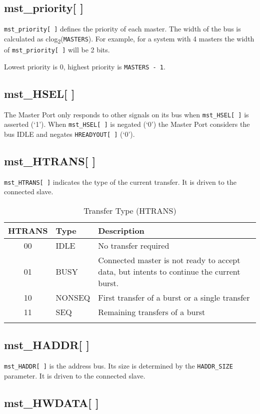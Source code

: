 \subsection{mst\_priority[ ]}\label{mst_priority}

\texttt{mst\_priority[\,]} defines the priority of each master. The width of the bus is calculated as clog\textsubscript{2}(\texttt{MASTERS}). For example, for a system with 4 masters the width of \texttt{mst\_priority[\,]} will be 2 bits.

Lowest priority is 0, highest priority is \texttt{MASTERS - 1}.

\subsection{mst\_HSEL[ ]}\label{mst_hsel}

The Master Port only responds to other signals on its bus when \texttt{mst\_HSEL[\,]} is
asserted (`1'). When \texttt{mst\_HSEL[\,]} is negated (`0') the Master Port
considers the bus IDLE and negates \texttt{HREADYOUT[\,]} (`0').

\subsection{mst\_HTRANS[ ]}\label{mst_htrans}

\texttt{mst\_HTRANS[ ]} indicates the type of the current transfer. It is driven to
the connected slave.

\begin{longtable}[]{@{}clp{9cm}@{}}
\toprule
HTRANS & Type & Description\tabularnewline
\midrule
\endhead
00 & IDLE & No transfer required\tabularnewline
01 & BUSY & Connected master is not ready to accept data, but intents to
continue the current burst.\tabularnewline
10 & NONSEQ & First transfer of a burst or a single
transfer\tabularnewline
11 & SEQ & Remaining transfers of a burst\tabularnewline
\bottomrule
\caption{Transfer Type (HTRANS)}
\end{longtable}


\subsection{mst\_HADDR[ ]}\label{mst_haddr}

\texttt{mst\_HADDR[\,]} is the address bus. Its size is determined by the \texttt{HADDR\_SIZE}
parameter. It is driven to the connected slave.

\subsection{mst\_HWDATA[ ]}\label{mst_hwdata}

